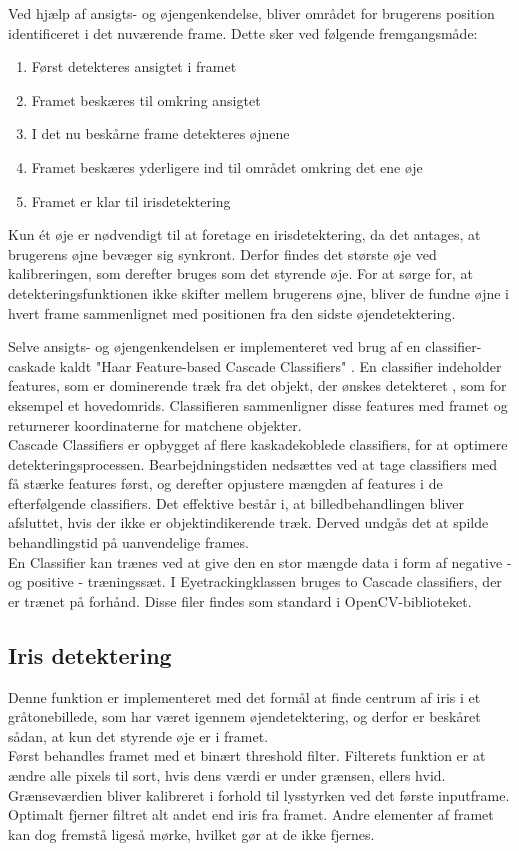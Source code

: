 Ved hjælp af ansigts- og øjengenkendelse, bliver området for brugerens position identificeret i det nuværende frame. Dette sker ved følgende fremgangsmåde: 

\begin{enumerate}
	\item Først detekteres ansigtet i framet 
	\item Framet beskæres til omkring ansigtet
	\item I det nu beskårne frame detekteres øjnene
	\item Framet beskæres yderligere ind til området omkring det ene øje
	\item Framet er klar til irisdetektering
\end{enumerate}

Kun ét øje er nødvendigt til at foretage en irisdetektering, da det antages, at brugerens øjne bevæger sig synkront. 
Derfor findes det største øje ved kalibreringen, som derefter bruges som det styrende øje. 
For at sørge for, at detekteringsfunktionen ikke skifter mellem brugerens øjne, bliver de fundne øjne i hvert frame sammenlignet med positionen fra den sidste øjendetektering. 

Selve ansigts- og øjengenkendelsen er implementeret ved brug af en classifier-caskade kaldt "Haar Feature-based Cascade Classifiers" \cite{MRL}. 
En classifier indeholder features, som er dominerende træk fra det objekt, der ønskes detekteret \cite{VIOLA}, som for eksempel et hovedomrids. 
Classifieren sammenligner disse features med framet og returnerer koordinaterne for matchene objekter. \\
Cascade Classifiers er opbygget af flere kaskadekoblede classifiers, for at optimere detekteringsprocessen. 
Bearbejdningstiden nedsættes ved at tage classifiers med få stærke features først, og derefter opjustere mængden af features i de efterfølgende classifiers.  
Det effektive består i, at billedbehandlingen bliver afsluttet, hvis der ikke er objektindikerende træk. 
Derved undgås det at spilde behandlingstid på uanvendelige frames.\\
En Classifier kan trænes ved at give den en stor mængde data i form af negative - og positive - træningssæt.
I Eyetrackingklassen bruges to Cascade classifiers, der er trænet på forhånd. Disse filer findes som standard i OpenCV-biblioteket.


\subsection{Iris detektering}
Denne funktion er implementeret med det formål at finde centrum af iris i et gråtonebillede, som har været igennem øjendetektering, og derfor er beskåret sådan, at kun det styrende øje er i framet. \\
Først behandles framet med et binært threshold filter.
Filterets funktion er at ændre alle pixels til sort, hvis dens værdi er under grænsen, ellers hvid. 
Grænseværdien bliver kalibreret i forhold til lysstyrken ved det første inputframe. 
Optimalt fjerner filtret alt andet end iris fra framet. 
Andre elementer af framet kan dog fremstå ligeså mørke, hvilket gør at de ikke fjernes. 

